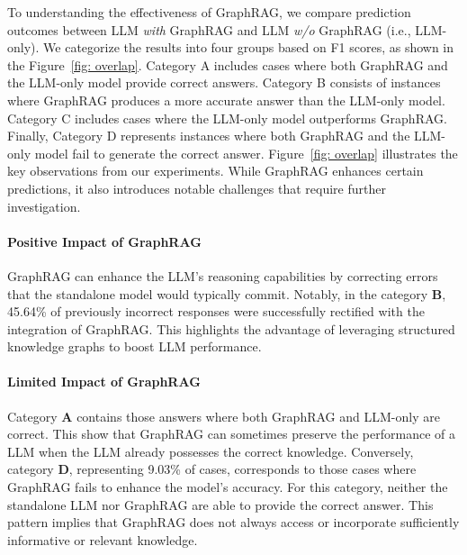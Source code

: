 \documentclass[11pt]{article}
\newcommand{\jt}[1]{{\color{red}[JT:#1]}}
\begin{document}



To understanding the effectiveness of GraphRAG, we compare prediction outcomes between LLM {\it with} GraphRAG and LLM {\it w/o} GraphRAG (i.e., LLM-only). 
We categorize the results into four groups based on F1 scores, as shown in the Figure~\ref{fig: overlap}. Category A includes cases where both GraphRAG and the LLM-only model provide correct answers. Category B consists of instances where GraphRAG produces a more accurate answer than the LLM-only model. Category C includes cases where the LLM-only model outperforms GraphRAG. Finally, Category D represents instances where both GraphRAG and the LLM-only model fail to generate the correct answer.
Figure~\ref{fig: overlap} illustrates the key observations from our experiments. While GraphRAG enhances certain predictions, it also introduces notable challenges that require further investigation.

\paragraph{Positive Impact of GraphRAG}  
GraphRAG can enhance the LLM's reasoning capabilities by correcting errors that the standalone model would typically commit. Notably, in the category \textbf{B}, 45.64\% of previously incorrect responses were successfully rectified with the integration of GraphRAG. This highlights the advantage of leveraging structured knowledge graphs to boost LLM performance.

\paragraph{Limited Impact of GraphRAG} Category {\bf A} contains those answers where both GraphRAG and LLM-only are correct. This show that GraphRAG can sometimes preserve the performance of a LLM when the LLM already possesses the correct knowledge. Conversely, category \textbf{D}, representing 9.03\% of cases, corresponds to those cases where GraphRAG fails to enhance the model's accuracy. For this category, neither the standalone LLM nor GraphRAG are able to provide the correct answer. This pattern implies that GraphRAG does not always access or incorporate sufficiently informative or relevant knowledge.
\end{document}
